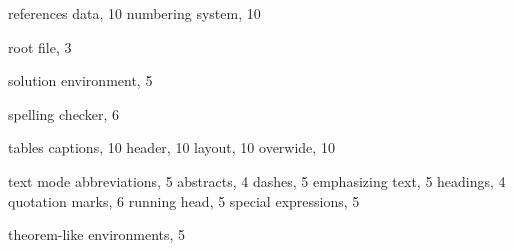 \documentclass[graybox]{svmono}
\begin{document}
\begin{theindex}
\indexspace

\item references
\subitem data, 10
\subitem numbering system, 10

\indexspace
\item root file, 3
\indexspace

\item solution environment, 5
\item spelling checker, 6

\indexspace

\item tables
\subitem captions, 10
\subitem header, 10
\subitem layout, 10
\subitem overwide, 10

\item text mode
\subitem abbreviations, 5
\subitem abstracts, 4
\subitem dashes, 5
\subitem emphasizing text, 5
\subitem headings, 4
\subitem quotation marks, 6
\subitem running head, 5
\subitem special expressions, 5
\item theorem-like environments, 5

\vfill\eject

\end{theindex}
\end{document}
